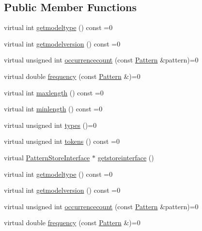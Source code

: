 \subsection*{Public Member Functions}
\begin{DoxyCompactItemize}
\item 
virtual int \hyperlink{classPatternModelInterface_ad485931462c2f1c1bcd0aac13ec3028b}{getmodeltype} () const  =0
\item 
virtual int \hyperlink{classPatternModelInterface_a0d58b42e55df75e04faae361677aa777}{getmodelversion} () const  =0
\item 
virtual unsigned int \hyperlink{classPatternModelInterface_afd9ec4756bb723ee6bf94321f05f1b71}{occurrencecount} (const \hyperlink{classPattern}{Pattern} \&pattern)=0
\item 
virtual double \hyperlink{classPatternModelInterface_abab22952ac502743377e3a5a524e2ae1}{frequency} (const \hyperlink{classPattern}{Pattern} \&)=0
\item 
virtual int \hyperlink{classPatternModelInterface_acbe234679e86792765d3afade8ce014c}{maxlength} () const  =0
\item 
virtual int \hyperlink{classPatternModelInterface_a53325f7b36c9cf0de4954b618eff2416}{minlength} () const  =0
\item 
virtual unsigned int \hyperlink{classPatternModelInterface_a5f3fab33835e8b01bf30b20793746e24}{types} ()=0
\item 
virtual unsigned int \hyperlink{classPatternModelInterface_aafea9a0f8fd453b85cffd18709a42ae7}{tokens} () const  =0
\item 
virtual \hyperlink{classPatternStoreInterface}{Pattern\+Store\+Interface} $\ast$ \hyperlink{classPatternModelInterface_a1bb04234bc1225becbec941a0efaa094}{getstoreinterface} ()
\item 
virtual int \hyperlink{classPatternModelInterface_ad485931462c2f1c1bcd0aac13ec3028b}{getmodeltype} () const  =0
\item 
virtual int \hyperlink{classPatternModelInterface_a0d58b42e55df75e04faae361677aa777}{getmodelversion} () const  =0
\item 
virtual unsigned int \hyperlink{classPatternModelInterface_afd9ec4756bb723ee6bf94321f05f1b71}{occurrencecount} (const \hyperlink{classPattern}{Pattern} \&pattern)=0
\item 
virtual double \hyperlink{classPatternModelInterface_abab22952ac502743377e3a5a524e2ae1}{frequency} (const \hyperlink{classPattern}{Pattern} \&)=0
\item 

\end{DoxyCompactItemize}

